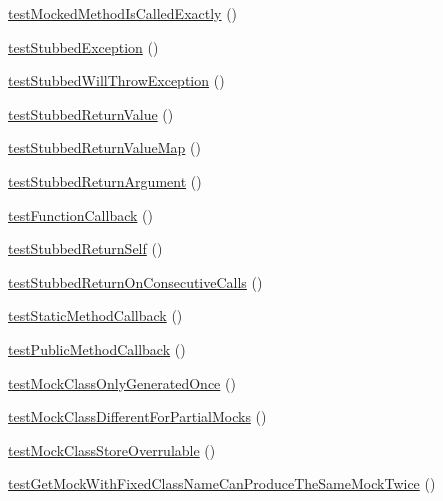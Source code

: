 \begin{DoxyCompactItemize}
\mbox{\hyperlink{class_framework___mock_object_test_a9e2d53998a9e628610214c6c561f6776}{test\+Mocked\+Method\+Is\+Called\+Exactly}} ()
\item 
\mbox{\hyperlink{class_framework___mock_object_test_aea5756141b5d5056734b88b9a0046502}{test\+Stubbed\+Exception}} ()
\item 
\mbox{\hyperlink{class_framework___mock_object_test_af223e538fc9bd9a95920667ec69c2bf3}{test\+Stubbed\+Will\+Throw\+Exception}} ()
\item 
\mbox{\hyperlink{class_framework___mock_object_test_acaf1de75056295c707a0f732ee8b3d97}{test\+Stubbed\+Return\+Value}} ()
\item 
\mbox{\hyperlink{class_framework___mock_object_test_ae360bd39b7a96cc9237e32fa5e85f00e}{test\+Stubbed\+Return\+Value\+Map}} ()
\item 
\mbox{\hyperlink{class_framework___mock_object_test_a15b359cc426463a3b5a0c3b3ba1b9ec6}{test\+Stubbed\+Return\+Argument}} ()
\item 
\mbox{\hyperlink{class_framework___mock_object_test_a96a78585d844396fecadb53b60111b71}{test\+Function\+Callback}} ()
\item 
\mbox{\hyperlink{class_framework___mock_object_test_ac8d645180c49caa256a0f3ee518c8dfa}{test\+Stubbed\+Return\+Self}} ()
\item 
\mbox{\hyperlink{class_framework___mock_object_test_a05fe3dddbb55163a216cf8b9a824ecca}{test\+Stubbed\+Return\+On\+Consecutive\+Calls}} ()
\item 
\mbox{\hyperlink{class_framework___mock_object_test_afc293b6a240fcd6d5c3869970792bcc4}{test\+Static\+Method\+Callback}} ()
\item 
\mbox{\hyperlink{class_framework___mock_object_test_adb6c683afffd3f76d373bd17dbf38fdc}{test\+Public\+Method\+Callback}} ()
\item 
\mbox{\hyperlink{class_framework___mock_object_test_a124d5f7e91683db227a6865be123ff89}{test\+Mock\+Class\+Only\+Generated\+Once}} ()
\item 
\mbox{\hyperlink{class_framework___mock_object_test_a2fb7dc109dd2efae9df37fc231ed2bf8}{test\+Mock\+Class\+Different\+For\+Partial\+Mocks}} ()
\item 
\mbox{\hyperlink{class_framework___mock_object_test_a8ed98fd71aa8d04da40a14912665168d}{test\+Mock\+Class\+Store\+Overrulable}} ()
\item 
\mbox{\hyperlink{class_framework___mock_object_test_af3e910ffa32afc485c0882b29fc7fed2}{test\+Get\+Mock\+With\+Fixed\+Class\+Name\+Can\+Produce\+The\+Same\+Mock\+Twice}} ()

\end{DoxyCompactItemize}
